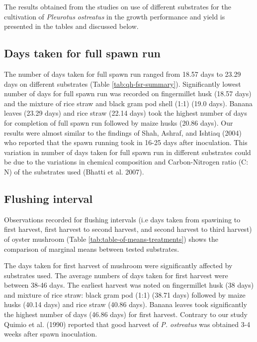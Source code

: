 \documentclass[]{article}
\begin{document}
The results obtained from the studies on use of different substrates for the cultivation of \textit{Pleurotus ostreatus} in the growth performance and yield is presented in the tables and discussed below.

\hypertarget{days-taken-for-full-spawn-run}{%
\subsection{Days taken for full spawn run}\label{days-taken-for-full-spawn-run}}

The number of days taken for full spawn run ranged from 18.57 days to 23.29 days on different substrates (Table \ref{tab:qh-fsr-summary}). Significantly lowest number of days for full spawn run was recorded on fingermillet husk (18.57 days) and the mixture of rice straw and black gram pod shell (1:1) (19.0 days). Banana leaves (23.29 days) and rice straw (22.14 days) took the highest number of days for completion of full spawn run followed by maize husks (20.86 days). Our results were almost similar to the findings of Shah, Ashraf, and Ishtiaq (2004) who reported that the spawn running took in 16-25 days after inoculation. This variation in number of days taken for full spawn run in different substrates could be due to the variations in chemical composition and Carbon-Nitrogen ratio (C: N) of the substrates used (Bhatti et al. 2007).

\hypertarget{flushing-interval}{%
\subsection{Flushing interval}\label{flushing-interval}}

Observations recorded for flushing intervals (i.e days taken from spawining to first harvest, first harvest to second harvest, and second harvest to third harvest) of oyster mushroom (Table \ref{tab:table-of-means-treatments}) shows the comparison of marginal means between tested substrates.

The days taken for first harvest of mushroom were significantly affected by substrates used. The average numbers of days taken for first harvest were between 38-46 days. The earliest harvest was noted on fingermillet husk (38 days) and mixture of rice straw: black gram pod (1:1) (38.71 days) followed by maize husks (40.14 days) and rice straw (40.86 days). Banana leaves took significantly the highest number of days (46.86 days) for first harvest. Contrary to our study Quimio et al. (1990) reported that good harvest of \textit{P. ostreatus} was obtained 3-4 weeks after spawn inoculation.
\end{document}
